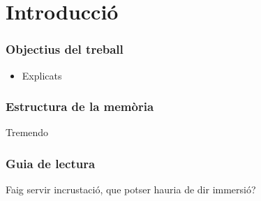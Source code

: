 \chapter{Introducci\'o}



\subsection*{Objectius del treball}

\begin{itemize}
    \item Explicats
\end{itemize}

\subsection*{Estructura de la mem\`oria}
Tremendo

\subsection*{Guia de lectura}
Faig servir incrustació, que potser hauria de dir immersió?

\newpage

\setcounter{page}{1}
